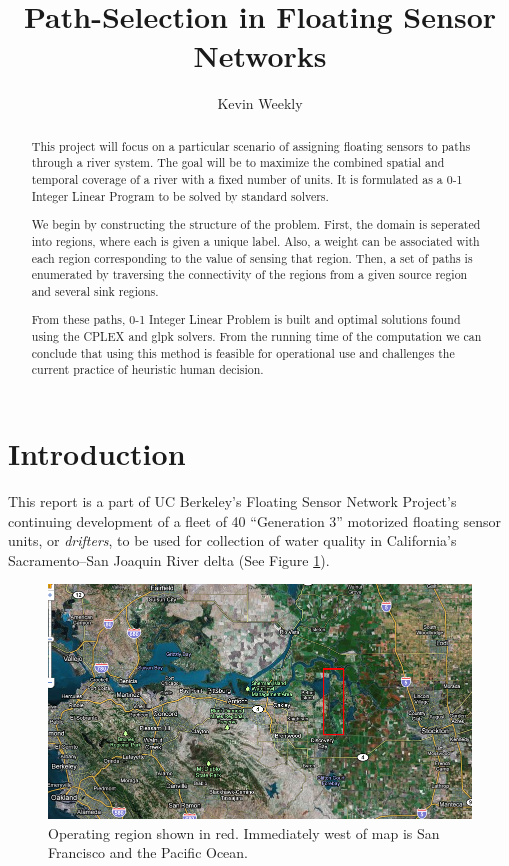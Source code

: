 \documentclass[11pt,letter]{article}
\title{Path-Selection in Floating Sensor Networks}
\author{Kevin Weekly}
\begin{document}
\maketitle

\begin{abstract}
This project will focus on a particular scenario of assigning floating sensors to paths through a river system.  The goal will be to maximize the combined spatial and temporal coverage of a river with a fixed number of units.  It is formulated as a 0-1 Integer Linear Program to be solved by standard solvers.

We begin by constructing the structure of the problem. First, the domain is seperated into regions, where each is given a unique label.  Also, a weight can be associated with each region corresponding to the value of sensing that region.  Then, a set of paths is enumerated by traversing the connectivity of the regions from a given source region and several sink regions.

From these paths, 0-1 Integer Linear Problem is built and optimal solutions found using the CPLEX and glpk solvers.  From the running time of the computation we can conclude that using this method is feasible for operational use and challenges the current practice of heuristic human decision.
\end{abstract}
\newpage
\tableofcontents

\section{Introduction}
This report is a part of UC Berkeley's Floating Sensor Network Project's\cite{fsnweb} continuing development of a fleet of 40 ``Generation 3'' motorized floating sensor units, or \emph{drifters}, to be used for collection of water quality in California's Sacramento--San Joaquin River delta (See Figure \ref{fig:domain}). 

\begin{figure}[ht]
\centering 
\includegraphics[width=1\linewidth]{figures/domain.png}
\caption{Operating region shown in red. Immediately west of map is San Francisco and the Pacific Ocean.\label{fig:domain}}
\end{figure}
\end{document}
